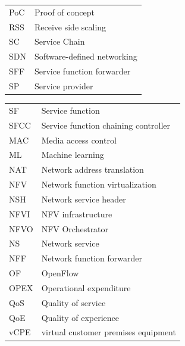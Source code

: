 \documentclass[futureinternet,review,accept,pdftex,moreauthors]{Definitions/mdpi}
\begin{document}
{\begin{tabular}{@{}m{2cm}<{\raggedright}m{10cm}<{\raggedright}}
PoC & Proof of concept \\

RSS & Receive side scaling \\

SC & Service Chain \\


SDN & Software-defined networking \\

SFF & Service function forwarder \\

SP & Service provider \\\end{tabular}

\noindent
\begin{tabular}{@{}m{2cm}<{\raggedright}m{10cm}<{\raggedright}}

SF & Service function \\

SFCC & Service function chaining controller \\

MAC & Media access control \\

ML & Machine learning \\

NAT & Network address translation \\

NFV & Network function virtualization\\

NSH & Network service header \\

NFVI & NFV infrastructure \\

NFVO & NFV Orchestrator \\

NS & Network service \\

NFF & Network function forwarder \\

OF & OpenFlow \\

OPEX & Operational expenditure \\

QoS & Quality of service \\

QoE & Quality of experience \\

vCPE & virtual customer premises equipment \\


\end{tabular}}
\end{document}

